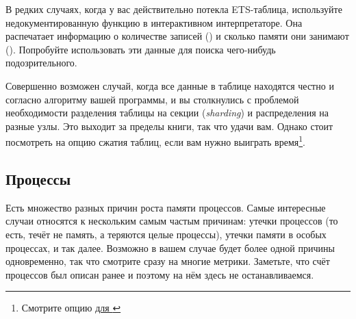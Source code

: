\documentclass[11pt, oneside]{book}   	%
\begin{document}
В редких случаях, когда у вас действительно потекла ETS-таблица, используйте недокументированную функцию  в интерактивном интерпретаторе. Она распечатает информацию о количестве записей () и сколько памяти они занимают (). Попробуйте использовать эти данные для поиска чего-нибудь подозрительного.

Совершенно возможен случай, когда все данные в таблице находятся честно и согласно алгоритму вашей программы, и вы столкнулись с проблемой необходимости разделения таблицы на секции (\emph{sharding}) и распределения на разные узлы. Это выходит за пределы книги, так что удачи вам. Однако стоит посмотреть на опцию сжатия таблиц, если вам нужно выиграть время\footnote{Смотрите опцию \href{http://www.erlang.org/doc/man/ets.html\#new-2}{ для }}.


\subsection{Процессы}

Есть множество разных причин роста памяти процессов. Самые интересные случаи относятся к нескольким самым частым причинам: утечки процессов (то есть, течёт не память, а теряются целые процессы), утечки памяти в особых процессах, и так далее. Возможно в вашем случае будет более одной причины одновременно, так что смотрите сразу на многие метрики. Заметьте, что счёт процессов был описан ранее и поэтому на нём здесь не останавливаемся.
\end{document}
